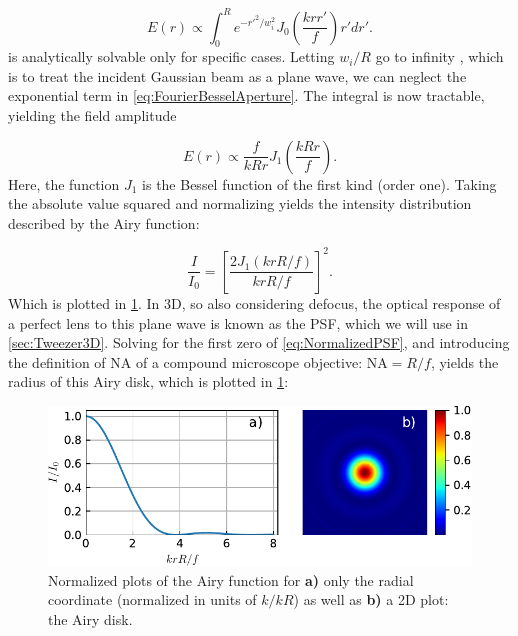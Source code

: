 \begin{equation}\label{eq:FourierBesselAperture}
    E(r) \propto \int_0^R e^{-r'^2/w_i^2} J_0\left(\frac{k r r'}{f}\right)r'dr'.
\end{equation}
 is analytically solvable only for specific cases.
Letting $w_i/R$ go to infinity \cite{Madjarov2020}, which is to treat the incident Gaussian beam as a plane wave, we can neglect the exponential term in \cref{eq:FourierBesselAperture}. 
The integral is now tractable, yielding the field amplitude

\begin{equation}\label{eq:AiryField}
    E(r) \propto \frac{f}{kRr} J_1\left(\frac{k R r}{f}\right).
\end{equation}
Here, the function $J_1$ is the Bessel function of the first kind (order one).
Taking the absolute value squared and normalizing yields the intensity distribution described by the Airy function:

\begin{equation}\label{eq:NormalizedPSF}
    \frac{I}{I_0} = \left[
    \frac{2J_1(k r R/f)}{k r R/f}
    \right]^2.
\end{equation}
Which is plotted in \cref{fig:AiryPlots}.
In 3D, so also considering defocus, the optical response of a perfect lens to this plane wave is known as the \ac{PSF}, which we will use in \cref{sec:Tweezer3D}.
Solving for the first zero of \cref{eq:NormalizedPSF}, and introducing the definition of \ac{NA} of a compound microscope objective: $\text{NA} = R/f$, yields the radius of this Airy disk, which is plotted in \cref{fig:AiryPlots}:

\begin{figure}
    \centering
    \includegraphics[width = 0.95\linewidth]{figures/AiryDisk.pdf}
    \caption{Normalized plots of the Airy function for \textbf{a)} only the radial coordinate (normalized in units of $k/kR$) as well as \textbf{b)} a 2D plot: the Airy disk.}
    \label{fig:AiryPlots}
\end{figure}

